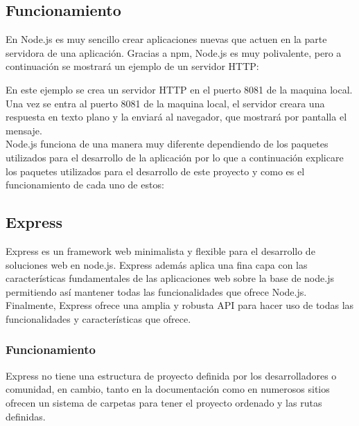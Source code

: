 \subsection{Funcionamiento}
En Node.js es muy sencillo crear aplicaciones nuevas que actuen en la parte servidora de una aplicación. Gracias a npm, Node.js es muy polivalente, pero a continuación se mostrará un ejemplo de un servidor HTTP:


En este ejemplo se crea un servidor HTTP en el puerto 8081 de la maquina local. Una vez se entra al puerto 8081 de la maquina local, el servidor creara una respuesta en texto plano y la enviará al navegador, que mostrará por pantalla el mensaje.\\

Node.js funciona de una manera muy diferente dependiendo de los paquetes utilizados para el desarrollo de la aplicación por lo que a continuación explicare los paquetes utilizados para el desarrollo de este proyecto y como es el funcionamiento de cada uno de estos:


\subsection{Express}
Express es un framework web minimalista y flexible para el desarrollo de soluciones web en node.js. Express además aplica una fina capa con las características fundamentales de las aplicaciones web sobre la base de node.js permitiendo así mantener todas las funcionalidades que ofrece Node.js. Finalmente, Express ofrece una amplia y robusta API para hacer uso de todas las funcionalidades y características que ofrece.

\subsubsection{Funcionamiento}
Express no tiene una estructura de proyecto definida por los desarrolladores o comunidad, en cambio, tanto en la documentación como en numerosos sitios ofrecen un sistema de carpetas para tener el proyecto ordenado y las rutas definidas.\\


